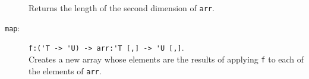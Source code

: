 \documentclass[fsharpNotes.tex]{subfiles}
\begin{document}
\begin{description}
  Returns the length of the second dimension of \lstinline{arr}.
\item[\texttt{map}:] \lstinline{f:('T -> 'U) -> arr:'T [,] -> 'U [,]}.~\\
  Creates a new array whose elements are the results of applying \lstinline{f} to each of the elements of \lstinline{arr}.
\end{description}
\end{document}
